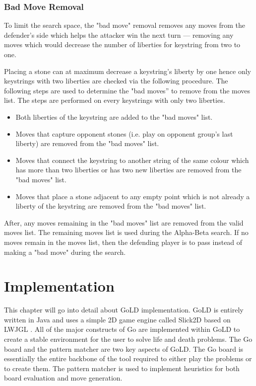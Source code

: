 \documentclass{l4proj}
\begin{document}
\subsection{Bad Move Removal}
To limit the search space, the "bad move" removal removes any moves from the defender's side which helps the attacker win the next turn — removing any moves which would decrease the number of liberties for keystring from two to one.

Placing a stone can at maximum decrease a keystring's liberty by one hence only keystrings with two liberties are checked via the following procedure. The following steps are used to determine the "bad moves” to remove from the moves list. The steps are performed on every keystrings with only two liberties.

\begin{itemize}
    \item Both liberties of the keystring are added to the "bad moves" list.
    \item Moves that capture opponent stones (i.e. play on opponent group's last liberty) are removed from the "bad moves" list.
    \item Moves that connect the keystring to another string of the same colour which has more than two liberties or has two new liberties are removed from the "bad moves" list.
    \item Moves that place a stone adjacent to any empty point which is not already a liberty of the keystring are removed from the "bad moves" list.
\end{itemize}

After, any moves remaining in the "bad moves" list are removed from the valid moves list. The remaining moves list is used during the Alpha-Beta search. If no moves remain in the moves list, then the defending player is to pass instead of making a "bad move" during the search.














\chapter{Implementation}
This chapter will go into detail about GoLD implementation. GoLD is entirely written in Java and uses a simple 2D game engine called Slick2D \cite{SLICK2D} based on LWJGL \cite{LWJGL}. All of the major constructs of Go are implemented within GoLD to create a stable environment for the user to solve life and death problems.  The Go board and the pattern matcher are two key aspects of GoLD. The Go board is essentially the entire backbone of the tool required to either play the problems or to create them. The pattern matcher is used to implement heuristics for both board evaluation and move generation.
\end{document}
